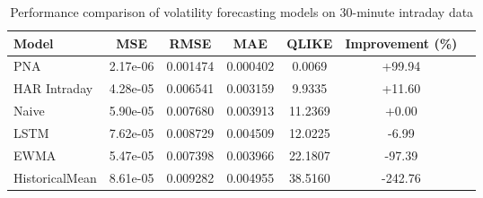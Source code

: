 \documentclass[journal]{IEEEtran}
\begin{document}
\begin{table}[!t]
\centering
\caption{Performance comparison of volatility forecasting models on 30-minute intraday data}
\label{tab:main_results}
\begin{tabular}{@{}lcccccc@{}}
\toprule
Model & MSE & RMSE & MAE & QLIKE & Improvement (\%) \\
\midrule
PNA & 2.17e-06 & 0.001474 & 0.000402 & 0.0069 & +99.94 \\
HAR Intraday & 4.28e-05 & 0.006541 & 0.003159 & 9.9335 & +11.60 \\
\rowcolor{bestcolor}Naive & 5.90e-05 & 0.007680 & 0.003913 & 11.2369 & +0.00 \\
LSTM & 7.62e-05 & 0.008729 & 0.004509 & 12.0225 & -6.99 \\
EWMA & 5.47e-05 & 0.007398 & 0.003966 & 22.1807 & -97.39 \\
HistoricalMean & 8.61e-05 & 0.009282 & 0.004955 & 38.5160 & -242.76 \\
\bottomrule
\end{tabular}
\end{table}
\end{document}
